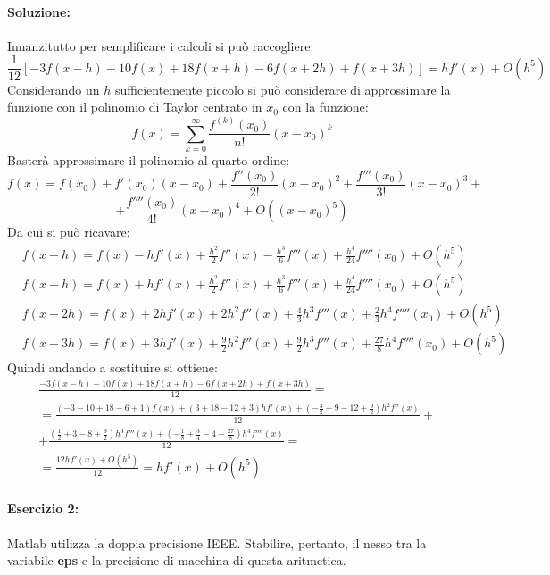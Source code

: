 \documentclass[12pt]{article}
\begin{document}
\paragraph{Soluzione:} 
Innanzitutto per semplificare i calcoli si può raccogliere: 
$$ \frac{1}{12}[-3f(x-h)-10f(x)+18f(x+h)-6f(x+2h)+f(x+3h)]=hf'(x) + O(h^5)$$
Considerando un \(h\) sufficientemente piccolo si può considerare di approssimare la funzione con il polinomio di Taylor
centrato in \(x_0\) con la funzione:
$$ f(x) = \sum_{k=0}^{\infty}{\frac{f^{(k)}(x_0)}{n!}(x-x_0)^k}$$
Basterà approssimare il polinomio al quarto ordine:
$$ f(x) = f(x_0) + f'(x_0)(x-x_0) + \frac{f''(x_0)}{2!}(x-x_0)^2+\frac{f'''(x_0)}{3!}(x-x_0)^3+$$
$$ + \frac{f''''(x_0)}{4!}(x-x_0)^4+O((x-x_0)^5)$$
Da cui si può ricavare:
\begin{equation}
    \begin{aligned}
        & f(x-h) = f(x) - hf'(x) + \frac{h^2}{2}f''(x)- \frac{h^3}{6}f'''(x)+ \frac{h^4}{24}f''''(x_0) + O(h^5)  \\
        & f(x+h) = f(x) + hf'(x) + \frac{h^2}{2}f''(x) + \frac{h^3}{6}f'''(x) + \frac{h^4}{24}f''''(x_0) + O(h^5)  \\
        & f(x+2h) = f(x) + 2hf'(x) + 2h^2f''(x)+ \frac{4}{3}h^3f'''(x)+ \frac{2}{3}h^4f''''(x_0) + O(h^5) \\
        & f(x+3h) = f(x) + 3hf'(x) + \frac{9}{2}h^2f''(x)+ \frac{9}{2}h^3f'''(x)+ \frac{27}{8}h^4f''''(x_0) + O(h^5)  
    \end{aligned}
\end{equation}
Quindi andando a sostituire si ottiene:
\begin{equation}
    \begin{aligned}
        &\frac{-3f(x-h)-10f(x)+18f(x+h)-6f(x+2h)+f(x+3h)}{12}=\\
        &=\frac{(-3-10+18-6+1)f(x) + (3+18-12+3)hf'(x)+(-\frac{3}{2}+9-12+\frac{9}{2})h^2f''(x)}{12}+ \\
        &+ \frac{(\frac{1}{2}+ 3 -8 +\frac{9}{2})h^3f'''(x) + (-\frac{1}{8}+\frac{3}{4} -4 +\frac{27}{8})h^4f''''(x)}{12}=\\
        &=\frac{12hf'(x) + O(h^5)}{12} = hf'(x)+O(h^5)
    \end{aligned}
\end{equation}
\pagebreak
\paragraph{Esercizio 2:}
Matlab utilizza la doppia precisione IEEE. Stabilire, pertanto, il nesso tra la variabile
\textbf{eps} e la precisione di macchina di questa aritmetica.
\end{document}
